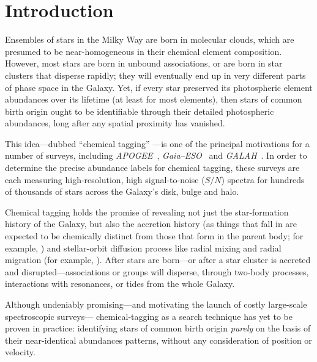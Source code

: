 \documentclass[12pt, letterpaper, preprint]{aastex}
\newcommand{\acronym}[1]{{\small{#1}}}
\newcommand{\project}[1]{\textsl{#1}}
\newcommand{\apogee}{\project{\acronym{APOGEE}}}
\newcommand{\gaiaeso}{\project{Gaia--\acronym{ESO}}}
\newcommand{\galah}{\project{\acronym{GALAH}}}
\begin{document}

\clearpage
\section{Introduction}\label{sec:intro}

Ensembles of stars in the Milky Way are born in molecular clouds,
which are presumed to be near-homogeneous in their chemical element
composition.
However, most stars are born in unbound associations, or are born in
star clusters that disperse rapidly; they will eventually end up in
very different parts of phase space in the Galaxy.
Yet, if every star preserved its photospheric element abundances over
its lifetime (at least for most elements), then stars of common birth
origin ought to be identifiable through their detailed photospheric
abundances, long after any spatial proximity has
vanished.

This idea---dubbed ``chemical tagging''
\citep{freeman}---is one of the principal motivations for a number
of surveys, including \apogee\ \citep{apogee},
\gaiaeso\ \citep{gaiaeso} and \galah\ \citep{galah}.
In order to determine the precise abundance labels for chemical
tagging, these surveys are each measuring high-resolution, high
signal-to-noise ($S/N$) spectra for hundreds of thousands of stars across the
Galaxy's disk, bulge and halo.

Chemical tagging holds the promise of revealing not just the
star-formation history of the Galaxy, but also the accretion history
(as things that fall in are expected to be chemically distinct from
those that form in the parent body; for example, \citealt{font}) and
stellar-orbit diffusion process like radial mixing and radial
migration (for example, \citealt{roskar, quillen}).  After
stars are born---or after a star cluster is accreted and
disrupted---associations or groups will disperse, through
two-body processes, interactions with resonances, or tides from the whole Galaxy.

Although undeniably promising---and motivating the 
launch of costly large-scale spectroscopic surveys---
chemical-tagging as a search technique has yet to be proven in
practice: identifying stars of common birth origin {\it purely} on the
basis of their near-identical abundances patterns, without any
consideration of position or velocity.
\end{document}

